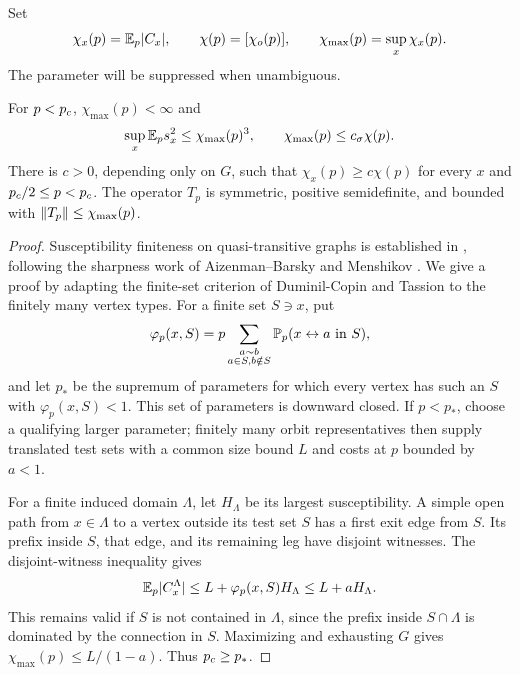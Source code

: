 Set
\[
 \chi_x(p)=\mathbb E_p|C_x|,\qquad
 \chi(p)=[\chi_o(p)],\qquad
 \chi_{\max}(p)=\sup_x\chi_x(p).
\]
The parameter will be suppressed when unambiguous.

\begin{lemma}
\label{pre:sharpness}
For $p<{p_c}$, $\chi_{\max}(p)<\infty$ and
\[
 \sup_x\mathbb E_p s_x^2\le\chi_{\max}(p)^3,
 \qquad \chi_{\max}(p)\le c_\sigma\chi(p).
\]
There is $c>0$, depending only on $G$, such that
$\chi_x(p)\ge c\chi(p)$ for every $x$ and
${p_c}/2\le p<{p_c}$. The operator $T_p$ is symmetric, positive
semidefinite, and bounded with $\lVert T_p\rVert\le\chi_{\max}(p)$.
\end{lemma}
\begin{proof}
Susceptibility finiteness on quasi-transitive graphs is established in
\cite[Theorem~2]{AntunovicVeselic2008}, following the sharpness work of
Aizenman--Barsky and Menshikov \cite{AizenmanBarsky1987,Menshikov1986}.
We give a proof by adapting the finite-set
criterion of Duminil-Copin and Tassion
\cite[Section~1]{DuminilCopinTassion2016} to the finitely many vertex
types.
For a finite set $S\ni x$, put
\[
 \varphi_p(x,S)=p\sum_{\substack{a\sim b\\a\in S, b\notin S}}
                 \mathbb P_p(x\leftrightarrow a\text{ in }S),
\]
and let $p_*$ be the supremum of parameters for which every vertex has
such an $S$ with $\varphi_p(x,S)<1$. This set of parameters is
downward closed. If $p<p_*$, choose a qualifying larger parameter;
finitely many orbit representatives then supply translated test sets
with a common size bound $L$ and costs at $p$ bounded by $a<1$.

For a finite induced domain $\Lambda$, let $H_\Lambda$ be its largest
susceptibility. A simple open path from $x\in\Lambda$ to a vertex
outside its test set $S$ has a first exit edge from $S$. Its prefix
inside $S$, that edge, and its remaining leg have disjoint witnesses.
The disjoint-witness inequality gives
\[
 \mathbb E_p|C_x^\Lambda|\le L+\varphi_p(x,S)H_\Lambda
 \le L+aH_\Lambda.
\]
This remains valid if $S$ is not contained in $\Lambda$, since the
prefix inside $S\cap\Lambda$ is dominated by the connection in $S$.
Maximizing and exhausting $G$ gives $\chi_{\max}(p)\le L/(1-a)$.
Thus ${p_c}\ge p_*$.


\end{proof}
